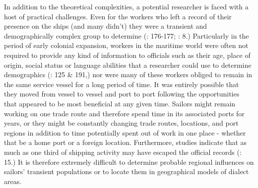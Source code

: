   In addition to the theoretical complexities, a potential researcher is faced with a host of practical challenges. Even for the workers who left a record of their presence on the ships (and many didn’t) they were a transient and demographically complex group to determine (\citealt{AdkinsAdkins2008}: 176-177; \citealt{Fusaro2015}: 8.) Particularly in the period of early colonial expansion, workers in the maritime world were often not required to provide any kind of information to officials such as their age, place of origin, social status or language abilities that a researcher could use to determine demographics (\citealt{Litter1999}: 125 \& 191,) nor were many of these workers obliged to remain in the same service vessel for a long period of time. It was entirely possible that they moved from vessel to vessel and port to port following the opportunities that appeared to be most beneficial at any given time. Sailors might remain working on one trade route and therefore spend time in its associated ports for years, or they might be constantly changing trade routes, locations, and port regions in addition to time potentially spent out of work in one place - whether that be a home port or a foreign location. Furthermore, studies indicate that as much as one third of shipping activity may have escaped the official records (\citealt{Cook2005}: 15.) It is therefore extremely difficult to determine probable regional influences on sailors’ transient populations or to locate them in geographical models of dialect areas.



